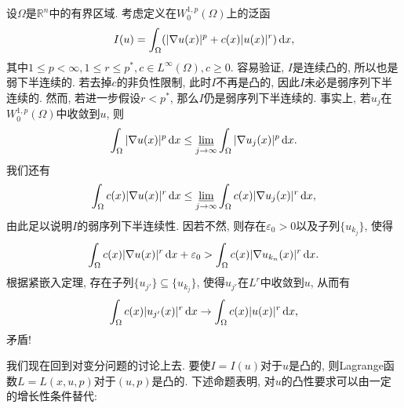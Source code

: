 \begin{example}\label{ex2.30}
    设$\Omega$是$\mathbb{R}^n$中的有界区域. 考虑定义在$W_0^{1, p}(\Omega)$上的泛函
    \begin{equation*}
        I(u) = \int_{\Omega}(|\nabla u(x)|^p + c(x)|u(x)|^r) \,{\rm d}x,
    \end{equation*}
    其中$1 \leq p < \infty, 1 \leq r \leq p^*, c \in L^{\infty}(\Omega), c \geq 0$.
    容易验证, $I$是连续凸的, 所以也是弱下半连续的. 若去掉$c$的非负性限制, 此时$I$不再是凸的, 因此$I$未必是弱序列下半连续的.
    然而, 若进一步假设$r < p^*$, 那么$I$仍是弱序列下半连续的. 事实上, 若$u_j$在$W_0^{1, p}(\Omega)$中收敛到$u$, 则 
    \begin{equation*}
        \int_{\Omega}|\nabla u(x)|^p \,{\rm d}x \leq \varliminf\limits_{j \rightarrow \infty}\int_{\Omega}|\nabla u_j(x)|^p \,{\rm d}x.
    \end{equation*}
    我们还有 
    \begin{equation*}
        \int_{\Omega}c(x)|\nabla u(x)|^r \,{\rm d}x \leq \varliminf\limits_{j \rightarrow \infty}\int_{\Omega}c(x)|\nabla u_j(x)|^r \,{\rm d}x,
    \end{equation*}
    由此足以说明$I$的弱序列下半连续性. 因若不然, 则存在$\varepsilon_0 > 0$以及子列$\{u_{k_j}\}$, 使得 
    \begin{equation*}
        \int_{\Omega}c(x)|\nabla u(x)|^r \,{\rm d}x + \varepsilon_0 > \int_{\Omega}c(x)|\nabla u_{k_n}(x)|^r \,{\rm d}x.
    \end{equation*}
    根据紧嵌入定理, 存在子列$\{u_{j'}\} \subseteq \{u_{k_j}\}$, 使得$u_{j'}$在$L^r$中收敛到$u$, 从而有 
    \begin{equation*}
        \int_{\Omega}c(x)|u_{j'}(x)|^r \,{\rm d}x \rightarrow \int_{\Omega}c(x)|u(x)|^r \,{\rm d}x,
    \end{equation*}
    矛盾!
\end{example}

我们现在回到对变分问题的讨论上去. 要使$I = I(u)$对于$u$是凸的, 则Lagrange函数$L = L(x, u, p)$对于$(u, p)$是凸的. 
下述命题表明, 对$u$的凸性要求可以由一定的增长性条件替代:

